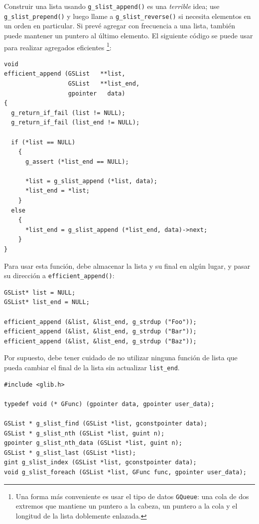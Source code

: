 Construir una lista usando \lstinline{g_slist_append()} es una \emph{terrible} idea; use \lstinline{g_slist_prepend()} y luego llame a \lstinline{g_slist_reverse()} si necesita elementos en un orden en particular. Si prevé agregar con frecuencia a una lista, también puede mantener un puntero al último elemento. El siguiente código se puede usar para realizar agregados eficientes \footnote{Una forma más conveniente es usar el tipo de datos \lstinline{GQueue}: una cola de dos extremos que mantiene un puntero a la cabeza, un puntero a la cola y el longitud de la lista doblemente enlazada.}:

\pagebreak[2]

\begin{lstlisting}[style=GLib/GTK]
void
efficient_append (GSList   **list,
                  GSList   **list_end,
                  gpointer   data)
{
  g_return_if_fail (list != NULL);
  g_return_if_fail (list_end != NULL);

  if (*list == NULL)
    {
      g_assert (*list_end == NULL);

      *list = g_slist_append (*list, data);
      *list_end = *list;
    }
  else
    {
      *list_end = g_slist_append (*list_end, data)->next;
    }
}
\end{lstlisting}

Para usar esta función, debe almacenar la lista y su final en algún lugar, y pasar su dirección a \lstinline{efficient_append()}:

\begin{lstlisting}[style=GLib/GTK]
GSList* list = NULL;
GSList* list_end = NULL;

efficient_append (&list, &list_end, g_strdup ("Foo"));
efficient_append (&list, &list_end, g_strdup ("Bar"));
efficient_append (&list, &list_end, g_strdup ("Baz"));
\end{lstlisting}

Por supuesto, debe tener cuidado de no utilizar ninguna función de lista que pueda cambiar el final de la lista sin actualizar \lstinline{list_end}.

\begin{lstlisting}[style=GLib/GTK, caption={Acceder a datos en una lista vinculada}, label=glib-listaccess]
#include <glib.h>

typedef void (* GFunc) (gpointer data, gpointer user_data);

GSList * g_slist_find (GSList *list, gconstpointer data);
GSList * g_slist_nth (GSList *list, guint n);
gpointer g_slist_nth_data (GSList *list, guint n);
GSList * g_slist_last (GSList *list);
gint g_slist_index (GSList *list, gconstpointer data);
void g_slist_foreach (GSList *list, GFunc func, gpointer user_data);
\end{lstlisting}

